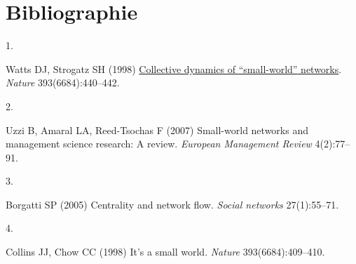 \documentclass[9pt,twocolumn,twoside,]{pnas-new}
\newlength{\cslhangindent}
\newlength{\csllabelwidth}
\newlength{\cslentryspacingunit} %
\newenvironment{CSLReferences}[2] %
 {%
  \setlength{\parindent}{0pt}
  \ifodd #1
  \let\oldpar\par
  \def\par{\hangindent=\cslhangindent\oldpar}
  \fi
  \setlength{\parskip}{#2\cslentryspacingunit}
 }%
 {}
\newcommand{\CSLLeftMargin}[1]{\parbox[t]{\csllabelwidth}{#1}}
\newcommand{\CSLRightInline}[1]{\parbox[t]{\linewidth - \csllabelwidth}{#1}\break}
\begin{document}
\newpage

\hypertarget{bibliographie}{%
\section*{Bibliographie}\label{bibliographie}}

\hypertarget{refs}{}
\begin{CSLReferences}{0}{0}
\leavevmode{}%
\CSLLeftMargin{1. }
\CSLRightInline{Watts DJ, Strogatz SH (1998)
\href{https://doi.org/10.1038/30918}{Collective dynamics of
{``small-world''} networks}. \emph{Nature} 393(6684):440--442.}

\leavevmode{}%
\CSLLeftMargin{2. }
\CSLRightInline{Uzzi B, Amaral LA, Reed-Tsochas F (2007) Small-world
networks and management science research: A review. \emph{European
Management Review} 4(2):77--91.}

\leavevmode{}%
\CSLLeftMargin{3. }
\CSLRightInline{Borgatti SP (2005) Centrality and network flow.
\emph{Social networks} 27(1):55--71.}

\leavevmode{}%
\CSLLeftMargin{4. }
\CSLRightInline{Collins JJ, Chow CC (1998) It's a small world.
\emph{Nature} 393(6684):409--410.}

\end{CSLReferences}



% 
\end{document}
